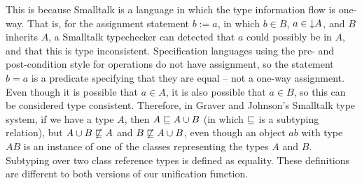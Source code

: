 This is because Smalltalk is a language in which the type information
flow is one-way. That is, for the assignment statement $b := a$, in
which $b \in B$, $a \in \mathord\downarrow A$, and $B$ inherits $A$, a Smalltalk
typechecker can detected that $a$ could possibly be in $A$, and that
this is type inconsistent. Specification languages using the pre- and
post-condition style for operations do not have assignment, so the
statement $b = a$ is a predicate specifying that they are equal -- not
a one-way assignment. Even though it is possible that $a \in A$, it is
also possible that $a \in B$, so this can be considered type
consistent. Therefore, in Graver and Johnson's Smalltalk type system,
if we have a type $A$, then $A \subtypeeq A \classuni B$ (in which
$\mathrel{\mathstrut{\sqsubseteq}}$ is a subtyping relation), but $A \classuni B
\not\subtypeeq A$ and $B \not\subtypeeq A \classuni B$, even though an
object $ab$ with type $AB$ is an instance of one of the classes
representing the types $A$ and $B$. Subtyping over two class reference
types is defined as equality. These definitions are
different to both versions of our unification function.
